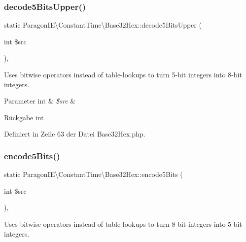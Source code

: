 \subsubsection{\texorpdfstring{decode5\+Bits\+Upper()}{decode5BitsUpper()}}
{\footnotesize\ttfamily static Paragon\+I\+E\textbackslash{}\+Constant\+Time\textbackslash{}\+Base32\+Hex\+::decode5\+Bits\+Upper (\begin{DoxyParamCaption}\item[{int}]{\$src }\end{DoxyParamCaption})\hspace{0.3cm}{\ttfamily [static]}, {\ttfamily [protected]}}

Uses bitwise operators instead of table-\/lookups to turn 5-\/bit integers into 8-\/bit integers.


\begin{DoxyParams}[1]{Parameter}
int & {\em \$src} & \\
\hline
\end{DoxyParams}
\begin{DoxyReturn}{Rückgabe}
int 
\end{DoxyReturn}


Definiert in Zeile 63 der Datei Base32\+Hex.\+php.

\mbox{\label{class_paragon_i_e_1_1_constant_time_1_1_base32_hex_a9b8e75156f677fa5f071f67d788de0a7}} 
\subsubsection{\texorpdfstring{encode5\+Bits()}{encode5Bits()}}
{\footnotesize\ttfamily static Paragon\+I\+E\textbackslash{}\+Constant\+Time\textbackslash{}\+Base32\+Hex\+::encode5\+Bits (\begin{DoxyParamCaption}\item[{int}]{\$src }\end{DoxyParamCaption})\hspace{0.3cm}{\ttfamily [static]}, {\ttfamily [protected]}}

Uses bitwise operators instead of table-\/lookups to turn 8-\/bit integers into 5-\/bit integers.


